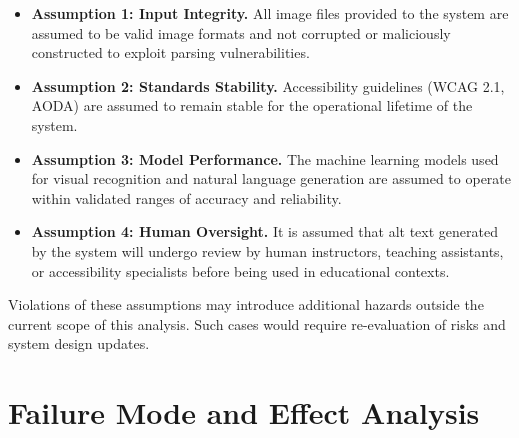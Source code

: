 \documentclass{article}
\begin{document}
\begin{itemize}
  \item \textbf{Assumption 1: Input Integrity.} All image files provided
    to the system are assumed to be valid image formats and not corrupted
    or maliciously constructed to exploit parsing vulnerabilities.

  \item \textbf{Assumption 2: Standards Stability.} Accessibility
    guidelines (WCAG 2.1, AODA) are assumed to remain stable for the
    operational lifetime of the system.

  \item \textbf{Assumption 3: Model Performance.} The machine learning
    models used for visual recognition and natural language generation are
    assumed to operate within validated ranges of accuracy and reliability.

  \item \textbf{Assumption 4: Human Oversight.} It is assumed that
    alt text generated by the system will undergo review by human
    instructors, teaching assistants, or accessibility specialists before
    being used in educational contexts.
\end{itemize}

Violations of these assumptions may introduce additional hazards outside
the current scope of this analysis. Such cases would require
re-evaluation of risks and system design updates.

\section{Failure Mode and Effect Analysis}
\end{document}
